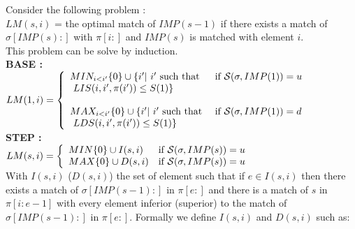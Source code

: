 \documentclass[a4paper]{llncs}
\newcommand{\ptext}{\pi}
\newcommand{\pmotif}{\sigma}
\newcommand{\dstep}{d}
\newcommand{\ustep}{u}
\begin{document}
			
			Consider the following problem :\\
			$LM(s,i)$ = the optimal match of 	
				$IMP(s-1)$ 
				if there exists a match of $\pmotif[IMP(s):]$ 
				with $\ptext[i:]$
				and $IMP(s)$ 
				is matched with element $i$.\\
				
			This problem can be solve by induction.\\
			
			\textbf{BASE :} \\
			$LM(1,i)= \left\{ 
					\begin{array}{l l}
					
						MIN_{i<i'}\{0\} \cup \{i' |\text{ $i'$ such that } & 
						\text{if $\mathcal{S}(\pmotif,IMP(1))=\ustep$}
						\\
						\text{ $LIS(i,i',\ptext(i')) \leq S(1)$}\}&\\			


						&\\
						
						MAX_{i<i'}\{0\} \cup \{i' |\text{ $i'$ such that } &
						\text{if $\mathcal{S}(\pmotif,IMP(1))=\dstep$} \\
						\text{ $LDS(i,i',\ptext(i')) \leq S(1)$}\}&\\			

					\end{array} \right. $\\	
		
			\textbf{STEP :} \\
			$LM(s,i)= \left\{ 
					\begin{array}{l l}
					
						MIN \{0\} \cup  I(s,i) & 
						\text{if $\mathcal{S}(\pmotif,IMP(s))=\ustep$}\\

						
						MAX \{0\} \cup  D(s,i) & 
						\text{if $\mathcal{S}(\pmotif,IMP(s))=\ustep$}\\
	
						
											
					\end{array} \right. $\\
					
			With $I(s,i)$ ($D(s,i)$) the set of element such that
			if  $e \in I(s,i)$ then there exists 
			a match of $\pmotif[IMP(s-1):]$ in $\ptext[e:]$ and
			there is a match of $s$ in $\ptext[i:e-1]$
			with every element inferior (superior) to the match of  
			$\pmotif[IMP(s-1):]$ in $\ptext[e:]$.
			Formally we define $I(s,i)$ and $D(s,i)$ such as:\\
			
\end{document}
